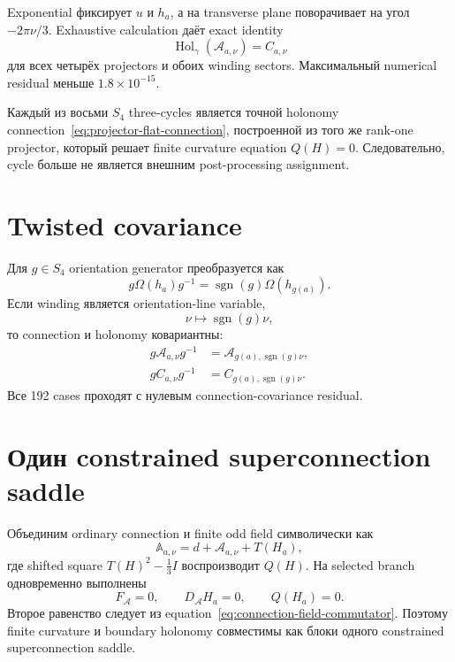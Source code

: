 Exponential фиксирует \(u\) и \(h_a\), а на transverse plane поворачивает
на угол \(-2\pi\nu/3\). Exhaustive calculation даёт exact identity
\begin{equation}
 \operatorname{Hol}_\gamma(\mathcal A_{a,\nu})=C_{a,\nu}
 \label{eq:holonomy-equals-three-cycle}
\end{equation}
для всех четырёх projectors и обоих winding sectors. Максимальный
numerical residual меньше \(1.8\times10^{-15}\).

\begin{theorem}
Каждый из восьми \(S_4\) three-cycles является точной holonomy
connection~\eqref{eq:projector-flat-connection}, построенной из того же
rank-one projector, который решает finite curvature equation
\(Q(H)=0\). Следовательно, cycle больше не является внешним
post-processing assignment.
\end{theorem}

\section{Twisted covariance}

Для \(g\in S_4\) orientation generator преобразуется как
\begin{equation}
 g\Omega(h_a)g^{-1}
 =\operatorname{sgn}(g)\Omega(h_{g(a)}).
\end{equation}
Если winding является orientation-line variable,
\begin{equation}
 \nu\longmapsto\operatorname{sgn}(g)\nu,
\end{equation}
то connection и holonomy ковариантны:
\begin{align}
 g\mathcal A_{a,\nu}g^{-1}
 &=\mathcal A_{g(a),\operatorname{sgn}(g)\nu},\\
 gC_{a,\nu}g^{-1}
 &=C_{g(a),\operatorname{sgn}(g)\nu}.
\end{align}
Все 192 cases проходят с нулевым connection-covariance residual.

\section{Один constrained superconnection saddle}

Объединим ordinary connection и finite odd field символически как
\begin{equation}
 \mathbb A_{a,\nu}=d+\mathcal A_{a,\nu}+T(H_a),
\end{equation}
где shifted square \(T(H)^2-\frac13I\) воспроизводит
\(Q(H)\). На selected branch одновременно выполнены
\begin{equation}
 F_{\mathcal A}=0,
 \qquad
 D_{\mathcal A}H_a=0,
 \qquad
 Q(H_a)=0.
\end{equation}
Второе равенство следует из
equation~\eqref{eq:connection-field-commutator}. Поэтому finite curvature
и boundary holonomy совместимы как блоки одного constrained
superconnection saddle.

